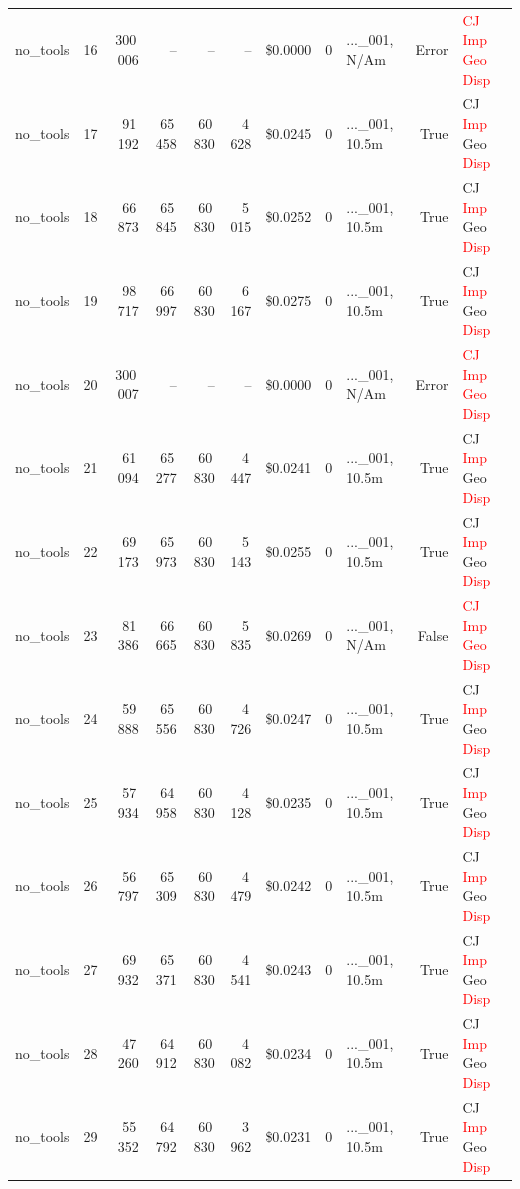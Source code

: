 \documentclass[a4paper,11pt]{article}
\begin{document}
\begin{table}[H]
{\begin{tabular}{l r r r r r r r l r l}
no\_tools & 16 & 300\,006 & -- & -- & -- & \$0.0000 & 0 & ...\_001, N/Am & Error & \textcolor{red}{CJ} \textcolor{red}{Imp} \textcolor{red}{Geo} \textcolor{red}{Disp} \\
no\_tools & 17 & 91\,192 & 65\,458 & 60\,830 & 4\,628 & \$0.0245 & 0 & ...\_001, 10.5m & True & CJ \textcolor{red}{Imp} Geo \textcolor{red}{Disp} \\
no\_tools & 18 & 66\,873 & 65\,845 & 60\,830 & 5\,015 & \$0.0252 & 0 & ...\_001, 10.5m & True & CJ \textcolor{red}{Imp} Geo \textcolor{red}{Disp} \\
no\_tools & 19 & 98\,717 & 66\,997 & 60\,830 & 6\,167 & \$0.0275 & 0 & ...\_001, 10.5m & True & CJ \textcolor{red}{Imp} Geo \textcolor{red}{Disp} \\
no\_tools & 20 & 300\,007 & -- & -- & -- & \$0.0000 & 0 & ...\_001, N/Am & Error & \textcolor{red}{CJ} \textcolor{red}{Imp} \textcolor{red}{Geo} \textcolor{red}{Disp} \\
no\_tools & 21 & 61\,094 & 65\,277 & 60\,830 & 4\,447 & \$0.0241 & 0 & ...\_001, 10.5m & True & CJ \textcolor{red}{Imp} Geo \textcolor{red}{Disp} \\
no\_tools & 22 & 69\,173 & 65\,973 & 60\,830 & 5\,143 & \$0.0255 & 0 & ...\_001, 10.5m & True & CJ \textcolor{red}{Imp} Geo \textcolor{red}{Disp} \\
no\_tools & 23 & 81\,386 & 66\,665 & 60\,830 & 5\,835 & \$0.0269 & 0 & ...\_001, N/Am & False & \textcolor{red}{CJ} \textcolor{red}{Imp} \textcolor{red}{Geo} \textcolor{red}{Disp} \\
no\_tools & 24 & 59\,888 & 65\,556 & 60\,830 & 4\,726 & \$0.0247 & 0 & ...\_001, 10.5m & True & CJ \textcolor{red}{Imp} Geo \textcolor{red}{Disp} \\
no\_tools & 25 & 57\,934 & 64\,958 & 60\,830 & 4\,128 & \$0.0235 & 0 & ...\_001, 10.5m & True & CJ \textcolor{red}{Imp} Geo \textcolor{red}{Disp} \\
no\_tools & 26 & 56\,797 & 65\,309 & 60\,830 & 4\,479 & \$0.0242 & 0 & ...\_001, 10.5m & True & CJ \textcolor{red}{Imp} Geo \textcolor{red}{Disp} \\
no\_tools & 27 & 69\,932 & 65\,371 & 60\,830 & 4\,541 & \$0.0243 & 0 & ...\_001, 10.5m & True & CJ \textcolor{red}{Imp} Geo \textcolor{red}{Disp} \\
no\_tools & 28 & 47\,260 & 64\,912 & 60\,830 & 4\,082 & \$0.0234 & 0 & ...\_001, 10.5m & True & CJ \textcolor{red}{Imp} Geo \textcolor{red}{Disp} \\
no\_tools & 29 & 55\,352 & 64\,792 & 60\,830 & 3\,962 & \$0.0231 & 0 & ...\_001, 10.5m & True & CJ \textcolor{red}{Imp} Geo \textcolor{red}{Disp} \\

\end{tabular}}
\end{table}
\end{document}
